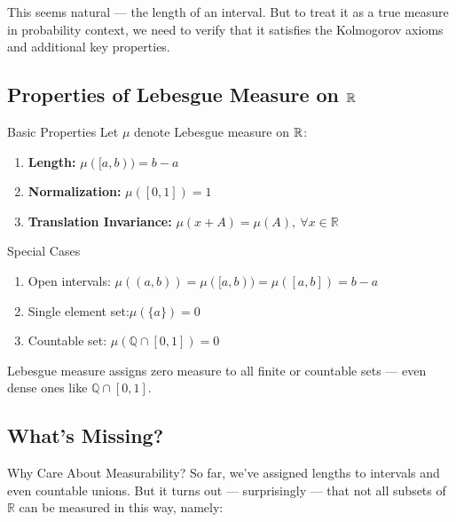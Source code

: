 This seems natural — the length of an interval. But to treat it as a true measure in probability context, we need to verify that it satisfies the Kolmogorov axioms and additional key properties.


\subsection{Properties of Lebesgue Measure on ${\mathbb{R}}$}

\begin{prop}{Basic Properties}
Let \( \mu \) denote Lebesgue measure on ${\mathbb{R}}$:
\begin{enumerate}
    \item \textbf{Length:} \( \mu([a, b)) = b - a \)
    \item \textbf{Normalization:} \( \mu([0, 1]) = 1 \)
    \item \textbf{Translation Invariance:} \( \mu(x + A) = \mu(A), \ \forall x \in \mathbb{R} \)
\end{enumerate}
\end{prop}

\begin{prop}{Special Cases}
\begin{enumerate}
    \item Open intervals: \( \mu((a, b)) = \mu([a, b)) = \mu([a, b]) = b - a \)
    \item Single element set:\( \mu(\{a\}) = 0 \)
    \item Countable set: \( \mu(\mathbb{Q} \cap [0, 1]) = 0 \)
\end{enumerate}
\end{prop}
\begin{rmk}
Lebesgue measure assigns zero measure to all finite or countable sets — even dense ones like \( \mathbb{Q} \cap [0,1] \).
\end{rmk}

\subsection{What’s Missing?}

\begin{rmk}{Why Care About Measurability?}
So far, we've assigned lengths to intervals and even countable unions. But it turns out — surprisingly — that not all subsets of \( \mathbb{R} \) can be measured in this way, namely:
\end{rmk}




